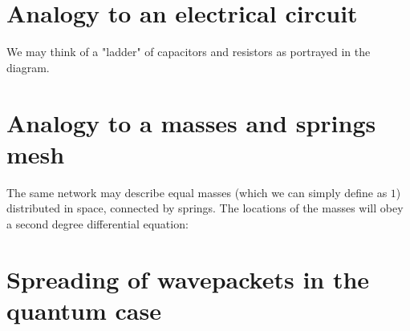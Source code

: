 \section{Analogy to an electrical circuit}

We may think of a "ladder" of capacitors and resistors as portrayed in the diagram.



\section{Analogy to a masses and springs mesh} 

The same network may describe equal masses (which 
we can simply define as $1$) distributed in space,
connected by springs. The locations of the masses will
obey a second degree differential equation:


\section{Spreading of wavepackets in the quantum case}





